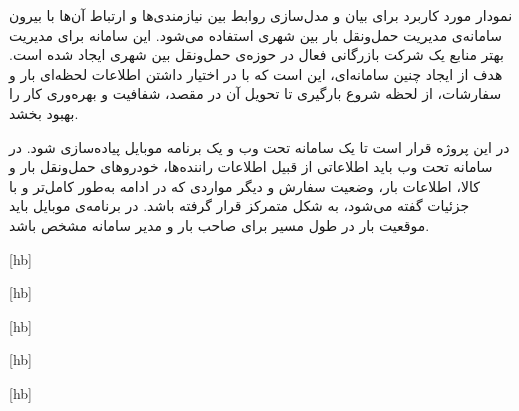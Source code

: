 
نمودار مورد کاربرد برای بیان و مدل‌سازی روابط بین نیازمندی‌ها و ارتباط آن‌ها با بیرون سامانه‌ی مدیریت حمل‌ونقل بار بین شهری استفاده می‌شود. این سامانه برای مدیریت بهتر منابع یک شرکت بازرگانی فعال در حوزه‌ی حمل‌ونقل بین شهری ایجاد شده است. هدف از ایجاد چنین سامانه‌ای، این است که با در اختیار داشتن اطلاعات لحظه‌ای بار و سفارشات، از لحظه شروع بارگیری تا تحویل آن در مقصد، شفافیت و بهره‌وری کار را بهبود بخشد. 

در این پروژه قرار است تا یک سامانه تحت وب و یک برنامه موبایل پیاده‌سازی شود. در سامانه تحت وب باید اطلاعاتی از قبیل اطلاعات راننده‌ها، خودروهای حمل‌ونقل بار و کالا، اطلاعات بار، وضعیت سفارش و دیگر مواردی که در ادامه  به‌طور کامل‌تر و با جزئیات گفته می‌شود، به شکل متمرکز قرار گرفته باشد. در برنامه‌ی موبایل باید موقعیت بار در طول مسیر برای صاحب بار و مدیر سامانه مشخص باشد.

\newpage
{}

[hb]

\newpage


[hb]

\newpage
{}

[hb]
\newpage
{}

[hb]
\newpage
{}

[hb]
